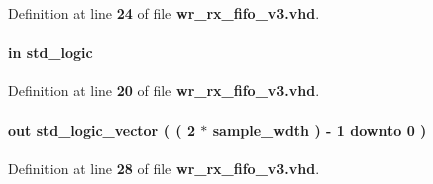 Definition at line {\bf 24} of file {\bf wr\+\_\+rx\+\_\+fifo\+\_\+v3.\+vhd}.

\paragraph[{clk}]{ {\bfseries \textcolor{keywordflow}{in}\textcolor{vhdlchar}{ }} {\bfseries \textcolor{comment}{std\+\_\+logic}\textcolor{vhdlchar}{ }} \hspace{0.3cm}{\ttfamily [Port]}}\label{classwr__rx__fifo__v3_a4a4609c199d30b3adebbeb3a01276ec5}


Definition at line {\bf 20} of file {\bf wr\+\_\+rx\+\_\+fifo\+\_\+v3.\+vhd}.

\paragraph[{diq}]{ {\bfseries \textcolor{keywordflow}{out}\textcolor{vhdlchar}{ }} {\bfseries \textcolor{comment}{std\+\_\+logic\+\_\+vector}\textcolor{vhdlchar}{ }\textcolor{vhdlchar}{(}\textcolor{vhdlchar}{ }\textcolor{vhdlchar}{(}\textcolor{vhdlchar}{ }\textcolor{vhdlchar}{ } \textcolor{vhdldigit}{2} \textcolor{vhdlchar}{$\ast$}\textcolor{vhdlchar}{ }\textcolor{vhdlchar}{ }\textcolor{vhdlchar}{ }{\bfseries {\bf sample\+\_\+wdth}} \textcolor{vhdlchar}{ }\textcolor{vhdlchar}{)}\textcolor{vhdlchar}{ }\textcolor{vhdlchar}{-\/}\textcolor{vhdlchar}{ } \textcolor{vhdldigit}{1} \textcolor{vhdlchar}{ }\textcolor{keywordflow}{downto}\textcolor{vhdlchar}{ }\textcolor{vhdlchar}{ } \textcolor{vhdldigit}{0} \textcolor{vhdlchar}{ }\textcolor{vhdlchar}{)}\textcolor{vhdlchar}{ }} \hspace{0.3cm}{\ttfamily [Port]}}\label{classwr__rx__fifo__v3_a32f91af3e8298457411dba5c7a3cda3c}


Definition at line {\bf 28} of file {\bf wr\+\_\+rx\+\_\+fifo\+\_\+v3.\+vhd}.

